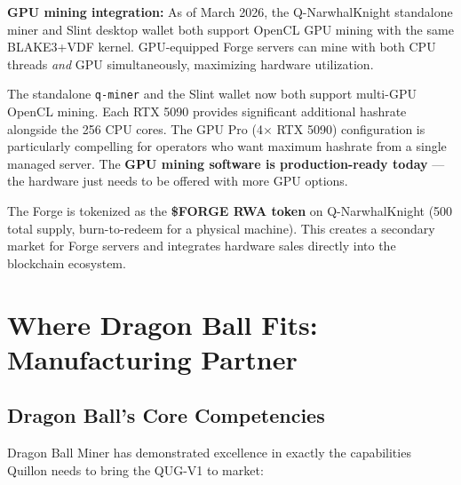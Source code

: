 \documentclass[11pt,a4paper]{article}
\begin{document}
\textbf{GPU mining integration:} As of March 2026, the Q-NarwhalKnight standalone miner and Slint desktop wallet both support OpenCL GPU mining with the same BLAKE3+VDF kernel. GPU-equipped Forge servers can mine with both CPU threads \textit{and} GPU simultaneously, maximizing hardware utilization.

\begin{keyinsight}
The standalone \texttt{q-miner} and the Slint wallet now both support multi-GPU OpenCL mining. Each RTX 5090 provides significant additional hashrate alongside the 256 CPU cores. The GPU Pro (4$\times$ RTX 5090) configuration is particularly compelling for operators who want maximum hashrate from a single managed server. The \textbf{GPU mining software is production-ready today} --- the hardware just needs to be offered with more GPU options.
\end{keyinsight}

The Forge is tokenized as the \textbf{\$FORGE RWA token} on Q-NarwhalKnight (500 total supply, burn-to-redeem for a physical machine). This creates a secondary market for Forge servers and integrates hardware sales directly into the blockchain ecosystem.


\section{Where Dragon Ball Fits: Manufacturing Partner}

\subsection{Dragon Ball's Core Competencies}

Dragon Ball Miner has demonstrated excellence in exactly the capabilities Quillon needs to bring the QUG-V1 to market:
\end{document}

